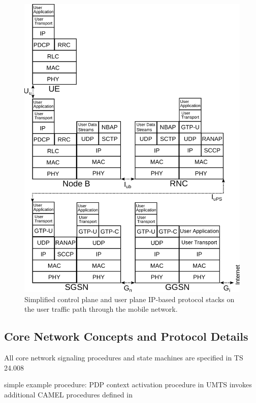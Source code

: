 \begin{figure}[htbp]
	\centering
 	\includegraphics[width=1.0\textwidth]{images/umts-userpath-stack.pdf}
 	\caption{Simplified control plane and user plane \gls{IP}-based protocol stacks on the user traffic path through the mobile network.}
 	\label{c4:fig:protocol stacks}
\end{figure}
	
\subsection{Core Network Concepts and Protocol Details}


All core network signaling procedures and state machines are specified in TS 24.008~\cite{3gpp.24.008}

simple example procedure:
	\gls{PDP} context activation procedure in \gls{UMTS}
	invokes additional \gls{CAMEL} procedures defined in \cite{3gpp.23.078}

